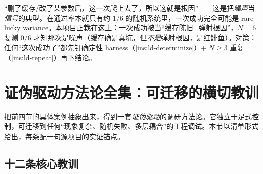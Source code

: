 \begin{pitfall}[对单次随机成功过度解读]
“删了缓存/改了某参数后，这一次爬上去了，所以这就是根因”——这是把\emph{噪声}当\emph{信号}的典型。在通过率本就只有约 $1/6$ 的随机系统里，一次成功完全可能是 rare lucky variance。本项目正栽在这上：一次成功被当“缓存陈旧=弹射根因”，$N=6$ 复测 $0/6$ 才知那次是噪声（缓存确是真坑，但\emph{不是}弹射根因，是红鲱鱼）。对策：任何“这次成功了”都先钉确定性 harness（\cref{ins:ld-determinize}）+ $N\ge 3$ 重复（\cref{ins:ld-repeat}）再下结论。
\end{pitfall}

\section{证伪驱动方法论全集：可迁移的横切教训}
\label{sec:ld-falsify}

把前四节的具体案例抽象出来，得到一套\emph{证伪驱动}的调研方法论。它独立于足式控制，可迁移到任何“现象复杂、随机失败、多层耦合”的工程调试。本节以清单形式给出，每条配一句源项目的实证锚点。

\subsection{十二条核心教训}
\label{subsec:ld-twelve}


